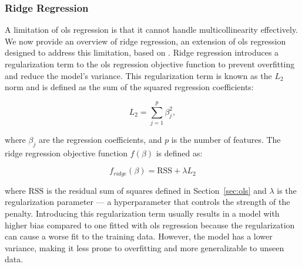 \subsubsection{Ridge Regression}
A limitation of \gls{ols} regression is that it cannot handle multicollinearity effectively.
We now provide an overview of ridge regression, an extension of \gls{ols} regression designed to address this limitation, based on \citet{James2023AnIS}.
Ridge regression introduces a regularization term to the \gls{ols} regression objective function to prevent overfitting and reduce the model's variance.
This regularization term is known as the $L_2$ norm and is defined as the sum of the squared regression coefficients:

$$
L_2 = \sum_{j=1}^{p} \beta_j^2,
$$

where $\beta_j$ are the regression coefficients, and $p$ is the number of features.
The ridge regression objective function $f(\beta)$ is defined as:

$$
f_{ridge}(\beta) = \text{RSS} + \lambda L_2
$$

where $\text{RSS}$ is the residual sum of squares defined in Section~\ref{sec:ols} and $\lambda$ is the regularization parameter --- a hyperparameter that controls the strength of the penalty.
Introducing this regularization term usually results in a model with higher bias compared to one fitted with \gls{ols} regression because the regularization can cause a worse fit to the training data.
However, the model has a lower variance, making it less prone to overfitting and more generalizable to unseen data.